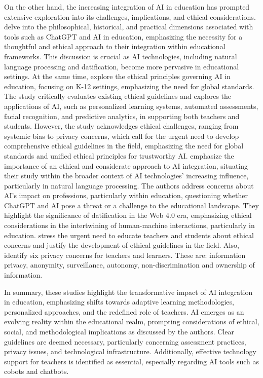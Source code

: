 On the other hand, the increasing integration of AI in education has
prompted extensive exploration into its challenges, implications, and
ethical considerations. \textcite[p.~4]{rodrigues2023} delve into
the philosophical, historical, and practical dimensions associated with
tools such as ChatGPT and AI in education, emphasizing the necessity for
a thoughtful and ethical approach to their integration within
educational frameworks. This discussion is crucial as AI technologies,
including natural language processing and datification, become more
pervasive in educational settings. At the same time, \textcite[p.~4222]{nguyen2023} explore the ethical principles governing AI in
education, focusing on K-12 settings, emphasizing the need for global
standards. The study critically evaluates existing ethical guidelines
and explores the applications of AI, such as personalized learning
systems, automated assessments, facial recognition, and predictive
analytics, in supporting both teachers and students. However, the study
acknowledges ethical challenges, ranging from systemic bias to privacy
concerns, which call for the urgent need to develop comprehensive
ethical guidelines in the field, emphasizing the need for global
standards and unified ethical principles for trustworthy AI. \textcite{rodrigues2023} emphasize the importance of an ethical and
considerate approach to AI integration, situating their study within the
broader context of AI technologies' increasing
influence, particularly in natural language processing. The authors
address concerns about AI's impact on professions,
particularly within education, questioning whether ChatGPT and AI pose a
threat or a challenge to the educational landscape. They highlight the
significance of datification in the Web 4.0 era, emphasizing ethical
considerations in the intertwining of human-machine interactions,
particularly in education. \textcite{nguyen2023} stress the urgent need
to educate teachers and students about ethical concerns and justify the
development of ethical guidelines in the field. Also, \textcite[p.~170]{regan2019} identify six privacy concerns for teachers and learners.
These are: information privacy, anonymity, surveillance, autonomy,
non-discrimination and ownership of information.

In summary, these studies highlight the transformative impact of AI
integration in education, emphasizing shifts towards adaptive learning
methodologies, personalized approaches, and the redefined role of
teachers. AI emerges as an evolving reality within the educational
realm, prompting considerations of ethical, social, and methodological
implications as discussed by the authors. Clear guidelines are deemed
necessary, particularly concerning assessment practices, privacy issues,
and technological infrastructure. Additionally, effective technology
support for teachers is identified as essential, especially regarding AI
tools such as cobots and chatbots.